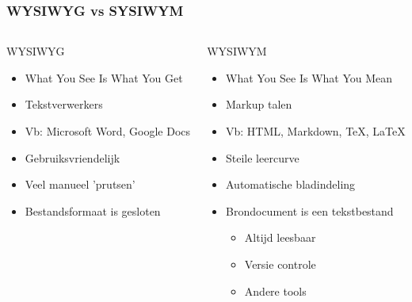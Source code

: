 \documentclass[13pt]{beamer}
\begin{document}
\begin{frame}
  \frametitle{WYSIWYG vs SYSIWYM}
  \begin{columns}[T] %
    \begin{column}{.48\textwidth}
      WYSIWYG
      \begin{itemize}
      \item {\scriptsize What You See Is What You} Get
      \item Tekstverwerkers
      \item Vb: Microsoft Word, Google Docs
      \item Gebruiksvriendelijk
      \item Veel manueel 'prutsen'
      \item Bestandsformaat is gesloten
      \end{itemize}
    \end{column}
    \hfill
    \begin{column}{.48\textwidth}
      WYSIWYM
      \begin{itemize}
      \item {\scriptsize What You See Is What You} Mean
      \item Markup talen
      \item Vb: HTML, Markdown, \TeX, \LaTeX
      \item Steile leercurve
      \item Automatische bladindeling
      \item Brondocument is een tekstbestand
        \begin{itemize}
        \item Altijd leesbaar
        \item Versie controle
        \item Andere tools
        \end{itemize}
      \end{itemize}
    \end{column}%
  \end{columns}
\end{frame}
\end{document}
